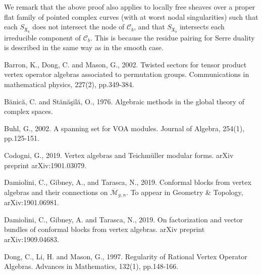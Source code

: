 \documentclass[12pt,a4paper,notitlepage]{article}
\theoremstyle{definition}
\theoremstyle{plain}
\newcommand{\fk}{\mathfrak}
\newcommand{\mc}{\mathcal}
\newcommand{\ovl}{\overline}
\numberwithin{equation}{section}
\begin{document}
We remark that the above proof also applies to locally free sheaves over a proper flat family of pointed complex curves (with at worst nodal singularities) such that each $S_{\fk X_b}$ does not intersect the node of $\mc C_b$, and that $S_{\fk X_b}$ intersects each irreducible component of $\mc C_b$. This is because the residue pairing for Serre duality is described in the same way as in the smooth case.
















\printindex	
	\begin{thebibliography}{999999}
		\footnotesize	
		
		
		
		

Barron, K., Dong, C. and Mason, G., 2002. Twisted sectors for tensor product vertex operator algebras associated to permutation groups. Communications in mathematical physics, 227(2), pp.349-384.



Bănică, C. and Stănăşilă, O., 1976. Algebraic methods in the global theory of complex spaces.

		
Buhl, G., 2002. A spanning set for VOA modules. Journal of Algebra, 254(1), pp.125-151.

Codogni, G., 2019. Vertex algebras and Teichm\"uller modular forms. arXiv preprint arXiv:1901.03079.	


Damiolini, C., Gibney, A., and Tarasca, N., 2019. Conformal blocks from vertex algebras and their connections on $\ovl{\mc M}_{g,n}$.  To appear in Geometry \& Topology, arXiv:1901.06981.

Damiolini, C., Gibney, A. and Tarasca, N., 2019. On factorization and vector bundles of conformal blocks from vertex algebras. arXiv preprint arXiv:1909.04683.


Dong, C., Li, H. and Mason, G., 1997. Regularity of Rational Vertex Operator Algebras. Advances in Mathematics, 132(1), pp.148-166.



\end{thebibliography}
\end{document}
